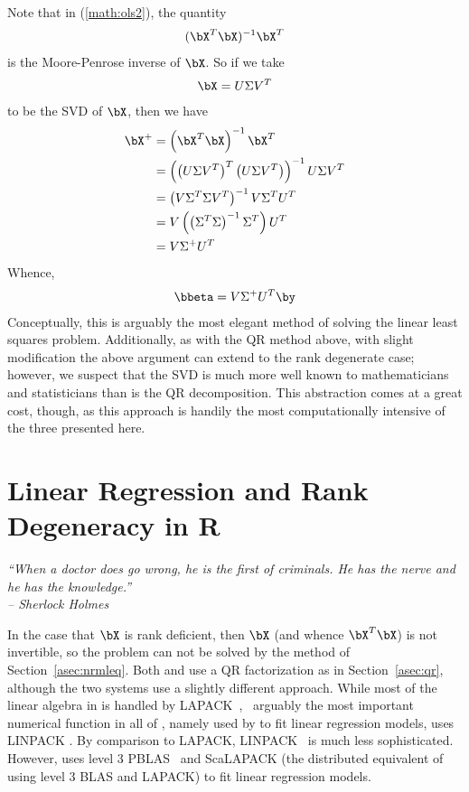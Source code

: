 Note that in (\ref{math:ols2}), the quantity
\begin{align*}
(\bX^T\bX)^{-1}\bX^T
\end{align*}
is the Moore-Penrose inverse of $\bX$.  So if we take
\begin{align*}
\bX = U\Sigma V^T
\end{align*}
to be the SVD of $\bX$, then we have
\begin{align*}
\bX^+ &= \left(\bX^T\bX\right)^{-1}\bX^T\\
  &= \left( \left(U\Sigma V^T\right)^T \left(U\Sigma V^T\right) \right)^{-1} U\Sigma V^T\\
  &= \left( V\Sigma^T\Sigma V^T \right)^{-1} V\Sigma^T U^T\\
  &= V \left( \left(\Sigma^T\Sigma\right)^{-1} \Sigma^T \right) U^T\\
  &= V \Sigma^+ U^T
\end{align*}
Whence,
\begin{align*}
\bbeta = V\Sigma^+ U^T\by
\end{align*}
Conceptually, this is arguably the most elegant method of solving the linear least squares problem.  Additionally, as with the QR method above, with slight modification the above argument can extend to the rank degenerate case; however, we suspect that the SVD is much more well known to mathematicians and statisticians than is the QR decomposition.  This abstraction comes at a great cost, though, as this approach is handily the most computationally intensive of the three presented here.




\chapter{Linear Regression and Rank Degeneracy in R}


{\it
``When a doctor does go wrong, he is the first of criminals.
He has the nerve and he has the knowledge.'' \\
\--- Sherlock Holmes
}
\vspace{0.5cm}


In the case that $\bX$ is rank deficient, then $\bX$ (and whence $\bX^T\bX$) is not invertible, so the problem can not be solved by the method of Section~\ref{asec:nrmleq}.  Both  and
 use a QR factorization as in Section~\ref{asec:qr}, although the two systems use a slightly different approach.  While most of the linear algebra in  is handled by
LAPACK~\citep{lug},~ arguably the most important numerical function in all of , namely  used by  to fit linear regression models, uses LINPACK \citep{linpack}.  By comparison to LAPACK,
LINPACK~ is much less sophisticated.  However,
 uses level 3
PBLAS~ and ScaLAPACK (the distributed equivalent of using level 3 BLAS and LAPACK) to fit linear regression models.


